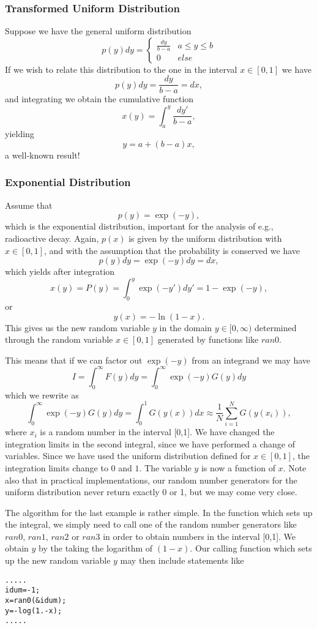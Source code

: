 \subsubsection{Transformed Uniform Distribution}

Suppose we have the general uniform distribution
\[
p(y)dy=\left\{\begin{array}{cc} \frac{dy}{b-a} & a \le y \le b\\
                                0  & else\end{array}\right.
\]
If we wish to relate this distribution to the one in the interval
$x \in [0,1]$
we have 
\[
   p(y)dy=\frac{dy}{b-a}=dx,  
\]
and integrating we obtain the cumulative function
\[
   x(y)=\int_a^y \frac{dy'}{b-a}, 
\]
yielding
\[
    y=a+(b-a)x,
\]
a well-known result!

\subsubsection{Exponential Distribution}

Assume that
\[
  p(y)=\exp{(-y)},
\]
which is the exponential distribution, important for the analysis
of e.g., radioactive decay. Again, 
$p(x)$ is given by the uniform distribution with 
$x \in [0,1]$, and 
with the assumption that the probability is conserved we have
\[
   p(y)dy=\exp{(-y)}dy=dx,  
\]
which yields after integration
\[
   x(y)=P(y)=\int_0^y \exp{(-y')}dy'=1-\exp{(-y)},
\]
or
\[
   y(x)=-\ln{(1-x)}.
\]
This gives us the new random variable $y$ in the domain
$y \in [0,\infty)$
determined through the random variable $x \in [0,1]$ generated by
functions like $ran0$. 

This means that if we can factor out 
$\exp{(-y)}$ from an integrand we may have 
\[
   I=\int_0^{\infty}F(y)dy=\int_0^{\infty}\exp{(-y)}G(y)dy   
\]
which we rewrite as
\[
  \int_0^{\infty}\exp{(-y)}G(y)dy=
   \int_0^{1}G(y(x))dx\approx 
   \frac{1}{N}\sum_{i=1}^NG(y(x_i)),
\]
where $x_i$ is a random number in the interval
[0,1]. We have changed the integration limits in the second integral, since we have performed a change of variables.  Since we have used the uniform distribution defined for $x\in [0,1]$, the integration limits change to $0$ and $1$. The variable $y$ is now a function of $x$.
Note also that in practical implementations, our random number generators for the 
uniform distribution never return exactly 0 or 1, but we may come very close.

The algorithm for the last example is rather simple. 
In the function which sets up the integral, we simply need
to call one of the random number generators 
like $ran0$, $ran1$, $ran2$ or $ran3$ in order to obtain numbers 
in the interval [0,1]. We obtain $y$ by the taking the logarithm of
$(1-x)$. Our calling function which sets up the new random
variable $y$ may then include statements like
\begin{lstlisting}
.....
idum=-1;
x=ran0(&idum);
y=-log(1.-x);
.....
\end{lstlisting}




